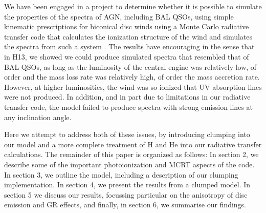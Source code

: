 \documentclass[preprint, a4paper, 11pt]{aastex}
\begin{document}
We have been engaged in a project to determine whether it is possible to simulate the properties of the spectra of AGN, including BAL QSOs, using simple kinematic prescriptions for biconical disc winds using a Monte Carlo radiative transfer code that calculates the ionization structure of the wind and simulates the spectra from such a system \citep[][hereafter H13]{simlong2008,sim2010,higginbottom2013}.   The results have encouraging in the sense that in H13, we showed we could produce simulated spectra that resembled that of BAL QSOs, as long as the luminosity of the central engine was relatively low, of order  and the mass loss rate was relatively high, of order the mass accretion rate.  However, at higher luminosities, the wind was so ionized that UV absorption lines were not produced.  In addition, and in part due to limitations in our radiative transfer code, the model failed to produce spectra with strong emission lines at any inclination angle.  

Here we attempt to address both of these issues, by introducing clumping into our model and a more complete treatment of H and He into our radiative transfer calculations.   The remainder of this paper is organized as follows:
In section 2, we describe some of the important photoionization 
and MCRT aspects of the code. In section 3, we outline the model, including 
a description of our clumping implementation. In section 4, we present the results 
from a clumped model. In section 5 we discuss our results, 
focussing particular on the anisotropy of 
disc emission and GR effects, and finally, in section 6, we summarise our findings.



\end{document}
